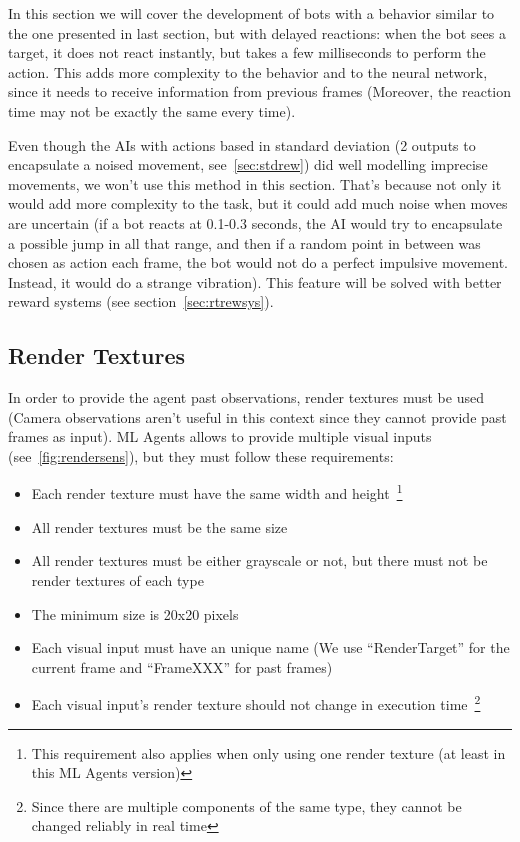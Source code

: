 In this section we will cover the development of bots with a behavior similar to the one presented in last section, but with delayed reactions: when the bot sees a target, it does not react instantly, but takes a few milliseconds to perform the action. This adds more complexity to the behavior and to the neural network, since it needs to receive information from previous frames (Moreover, the reaction time may not be exactly the same every time).

Even though the AIs with actions based in standard deviation (2 outputs to encapsulate a noised movement, see~\ref{sec:stdrew}) did well modelling imprecise movements, we won't use this method in this section. That's because not only it would add more complexity to the task, but it could add much noise when moves are uncertain (if a bot reacts at 0.1-0.3 seconds, the AI would try to encapsulate a possible jump in all that range, and then if a random point in between was chosen as action each frame, the bot would not do a perfect impulsive movement. Instead, it would do a strange vibration). This feature will be solved with better reward systems (see section~\ref{sec:rtrewsys}).

\subsection{Render Textures}

In order to provide the agent past observations, render textures must be used (Camera observations aren't useful in this context since they cannot provide past frames as input). ML Agents allows to provide multiple visual inputs (see~\ref{fig:rendersens}), but they must follow these requirements:

\begin{itemize}
 \item Each render texture must have the same width and height~\footnote{This requirement also applies when only using one render texture (at least in this ML Agents version)}
 \item All render textures must be the same size
 \item All render textures must be either grayscale or not, but there must not be render textures of each type
 \item The minimum size is 20x20 pixels
 \item Each visual input must have an unique name (We use ``RenderTarget'' for the current frame and ``FrameXXX'' for past frames)
 \item Each visual input's render texture should not change in execution time~\footnote{Since there are multiple components of the same type, they cannot be changed reliably in real time}
\end{itemize}

